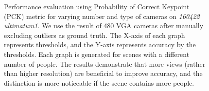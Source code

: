 \begin{figure}[t]
	\caption{Performance evaluation using Probability of Correct Keypoint (PCK) metric for varying number and type of cameras on \emph{160422 ultimatum1}. We use the result of 480 VGA cameras after manually excluding outliers as ground truth. The X-axis of each graph represents thresholds, and the Y-axis represents accuracy by the thresholds. Each graph is generated for scenes with a different number of people. The results demonstrate that more views (rather than higher resolution) are beneficial to improve accuracy, and the distinction is more noticeable if the scene contains more people.} 
	\label{fig:quant1}
\end{figure}


%		
%	

